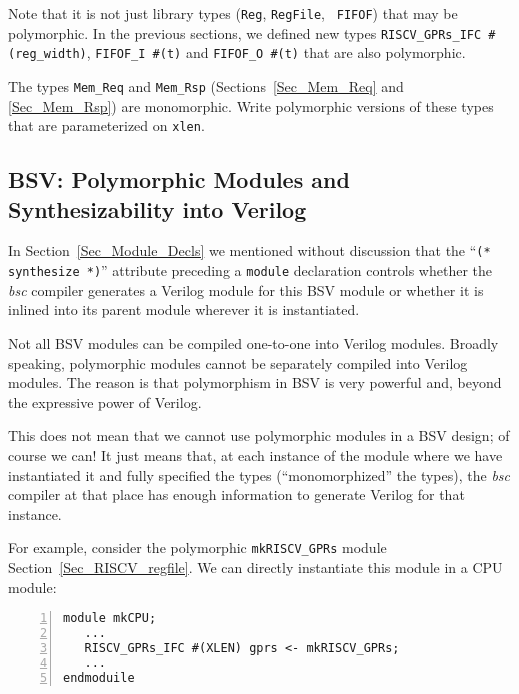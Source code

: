 Note that it is not just library types ({\tt Reg}, {\tt RegFile}, {\tt
FIFOF}) that may be polymorphic.  In the previous sections, we defined
new types \verb|RISCV_GPRs_IFC #(reg_width)|, \verb|FIFOF_I #(t)| and
\verb|FIFOF_O #(t)| that are also polymorphic.

\hdivider

\Exercise

The types {\tt Mem\_Req} and {\tt Mem\_Rsp}
(Sections~\ref{Sec_Mem_Req} and \ref{Sec_Mem_Rsp}) are monomorphic.
Write polymorphic versions of these types that are parameterized on
{\tt xlen}.

\Endexercise


\subsection{BSV: Polymorphic Modules and Synthesizability into Verilog}

\label{Sec_Polymorphic_Types_and_Synthesizability}


In Section~\ref{Sec_Module_Decls} we mentioned without discussion that
the ``{\tt (* synthesize *)}'' attribute preceding a {\tt module}
declaration controls whether the \emph{bsc} compiler generates a
Verilog module for this BSV module or whether it is inlined into its
parent module wherever it is instantiated.

Not all BSV modules can be compiled one-to-one into Verilog modules.
Broadly speaking, polymorphic modules cannot be separately compiled
into Verilog modules.  The reason is that polymorphism in BSV is very
powerful and, beyond the expressive power of Verilog.

This does not mean that we cannot use polymorphic modules in a BSV
design; of course we can!  It just means that, at each instance of the
module where we have instantiated it and fully specified the types
(``monomorphized'' the types), the \emph{bsc} compiler at that place
has enough information to generate Verilog for that instance.

For example, consider the polymorphic {\tt mkRISCV\_GPRs} module
Section~\ref{Sec_RISCV_regfile}.  We can directly instantiate this
module in a CPU module:

{\small
\begin{Verbatim}[frame=single, numbers=left]
module mkCPU;
   ...
   RISCV_GPRs_IFC #(XLEN) gprs <- mkRISCV_GPRs;
   ...
endmoduile
\end{Verbatim}
}


